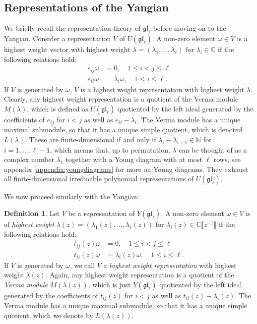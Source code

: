 \documentclass[11pt]{report}
\theoremstyle{definition}
\newtheorem{definition}[theorem]{Definition}
\theoremstyle{remark}
\theoremstyle{remark}
\newcommand{\N}{\mathbb{N}}
\newcommand{\C}{\mathbb{C}}
\begin{document}
\subsection{Representations of the Yangian}

We briefly recall the representation theory of $\mathfrak{gl}_\ell$ before moving on to the Yangian. Consider a representation $V$ of $U(\mathfrak{gl}_\ell)$. A non-zero element $\omega \in V$ is a highest weight vector with highest weight $\lambda = (\lambda_1,...,\lambda_\ell)$ for $\lambda_i \in \C$ if the following relations hold:
\begin{align*}
e_{ij} \omega &= 0, \quad 1 \leq i < j \leq \ell \\
e_{ii} \omega &= \lambda_i \omega, \quad 1 \leq i \leq \ell.
\end{align*}
If $V$ is generated by $\omega$, $V$ is a highest weight representation with highest weight $\lambda$. Clearly, any highest weight representation is a quotient of the Verma module $M(\lambda)$, which is defined as $U(\mathfrak{gl}_\ell)$ quotiented by the left ideal generated by the coefficients of $e_{ij}$ for $i<j$ as well as $e_{ii} - \lambda_i$. The Verma module has a unique maximal submodule, so that it has a unique simple quotient, which is denoted $L(\lambda)$. These are finite-dimensional if and only if $\lambda_i - \lambda_{i+1} \in \N$ for $i=1,...,\ell-1$, which means that, up to permutation, $\lambda$ can be thought of as a complex number $\lambda_1$ together with a Young diagram with at most $\ell$ rows, see appendix \ref{appendix:youngdiagrams} for more on Young diagrams. They exhaust all finite-dimensional irreducible polynomial representations of $U(\mathfrak{gl}_\ell)$.

We now proceed similarly with the Yangian:

\begin{definition}
Let $V$ be a representation of $Y(\mathfrak{gl}_\ell)$. A non-zero element $\omega \in V$ is of \emph{highest weight} $\lambda(z) = (\lambda_1(z),...,\lambda_\ell(z))$ for $\lambda_i(z) \in \C\llbracket z^{-1} \rrbracket$ if the following relations hold:
\begin{align*}
t_{ij}(z) \omega &= 0, \quad 1 \leq i < j \leq \ell \\
t_{ii}(z) \omega &= \lambda_i(z) \omega, \quad 1 \leq i \leq \ell.
\end{align*}
If $V$ is generated by $\omega$, we call $V$ a \emph{highest weight representation} with highest weight $\lambda(z)$. Again, any highest weight representation is a quotient of the \emph{Verma module} $M(\lambda(z))$, which is just $Y(\mathfrak{gl}_\ell)$ quotiented by the left ideal generated by the coefficients of $t_{ij}(z)$ for $i<j$ as well as $t_{ii}(z) - \lambda_i(z)$. The Verma module has a unique maximal submodule, so that it has a unique simple quotient, which we denote by $L(\lambda(z))$.
\end{definition}
\end{document}
